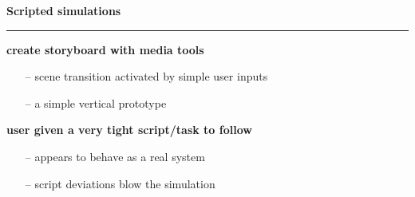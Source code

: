 \documentclass[pdf]{beamer}
\begin{document}
\begin{frame}
\vspace{8mm}
\textcolor{myBlue}{\textbf{\Large{Scripted simulations}}}

\textcolor{red}{\rule{10cm}{1mm}}

\hfill \linebreak
\textbf{create storyboard with media tools}
\begin{itemize}
      \item[\textcolor{black}{--}] scene transition activated by simple user inputs      
      \item[\textcolor{black}{--}]a simple vertical prototype
  \end{itemize}
  
  \hfill \linebreak
\textbf{user given a very tight script/task to follow}
\begin{itemize}
      \item[\textcolor{black}{--}] appears to behave as a real system
		\item[\textcolor{black}{--}]script deviations blow the simulation     
  \end{itemize}
   
\end{frame}
\end{document}
